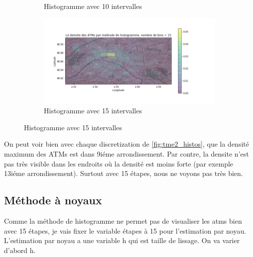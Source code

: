 \documentclass[a4paper,12pt]{article}
\begin{document}
\begin{figure}[h!]
\begin{subfigure}{.5\textwidth}
	\caption{Histogramme avec 10 intervalles}
\end{subfigure}
\begin{subfigure}{.5\textwidth}
  \centering
	\label{fig:atms_histo_15}
	\includegraphics[width=0.8\linewidth]{images/tme2/atms_histo_15.png}
	\caption{Histogramme avec 15 intervalles}
\end{subfigure}
\end{figure}

On peut voir bien avec chaque discretization de \autoref{fig:tme2_histos}, que la densité maximum des ATMs est dans 9iéme arrondissement.
Par contre, la densite n'est pas très visible dans les endroits où la densité est moins forte (par exemple 13iéme arrondissement).
Surtout avec 15 étapes, nous ne voyons pas très bien.

\subsection{Méthode à noyaux}

Comme la méthode de histogramme ne permet pas de visualiser les atms bien avec 15 étapes, je vais fixer le variable étapes à 15 pour l'estimation par noyau.
L'estimation par noyau a une variable h qui est taille de lissage. On va varier d'abord h.
\end{document}
